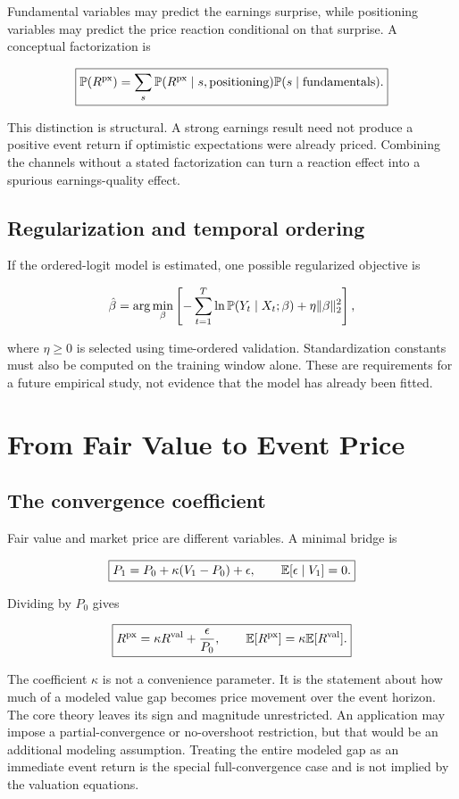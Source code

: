 Fundamental variables may predict the earnings surprise, while positioning
variables may predict the price reaction conditional on that surprise. A
conceptual factorization is

\[
\boxed{
\mathbb{P}(R^{\mathrm{px}})
=\sum_s \mathbb{P}(R^{\mathrm{px}}\mid s,\text{positioning})
\mathbb{P}(s\mid\text{fundamentals}).
}
\]

This distinction is structural. A strong earnings result need not produce a
positive event return if optimistic expectations were already priced. Combining
the channels without a stated factorization can turn a reaction effect into a
spurious earnings-quality effect.

\subsection{Regularization and temporal ordering}

If the ordered-logit model is estimated, one possible regularized objective is

\[
\hat\beta
=\arg\min_\beta\left[
-\sum_{t=1}^{T}\ln\mathbb{P}(Y_t\mid X_t;\beta)
 +\eta\|\beta\|_2^2
\right],
\]

where $\eta\ge 0$ is selected using time-ordered validation. Standardization
constants must also be computed on the training window alone. These are
requirements for a future empirical study, not evidence that the model has
already been fitted.

\section{From Fair Value to Event Price}
\label{sec:kappa}

\subsection{The convergence coefficient}

Fair value and market price are different variables. A minimal bridge is

\[
\boxed{
P_1=P_0+\kappa(V_1-P_0)+\epsilon,
\qquad
\mathbb{E}[\epsilon\mid V_1]=0.
}
\]

Dividing by $P_0$ gives

\[
\boxed{
R^{\mathrm{px}}=\kappa R^{\mathrm{val}}+\frac{\epsilon}{P_0},
\qquad
\mathbb{E}[R^{\mathrm{px}}]=\kappa\mathbb{E}[R^{\mathrm{val}}].
}
\]

The coefficient $\kappa$ is not a convenience parameter. It is the statement
about how much of a modeled value gap becomes price movement over the event
horizon. The core theory leaves its sign and magnitude unrestricted. An
application may impose a partial-convergence or no-overshoot restriction, but
that would be an additional modeling assumption. Treating the entire modeled
gap as an immediate event return is the special full-convergence case and is not
implied by the valuation equations.


